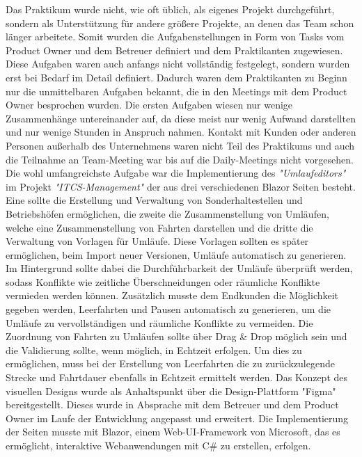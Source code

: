     Das Praktikum wurde nicht, wie oft üblich, als eigenes Projekt durchgeführt, sondern als
    Unterstützung für andere größere Projekte, an denen das Team schon länger arbeitete. Somit wurden die Aufgabenstellungen in Form von Tasks vom Product Owner und dem Betreuer definiert 
    und dem Praktikanten zugewiesen. Diese Aufgaben waren auch anfangs nicht vollständig festgelegt, sondern wurden erst bei Bedarf im Detail definiert. Dadurch waren dem Praktikanten zu Beginn
    nur die unmittelbaren Aufgaben bekannt, die in den Meetings mit dem Product Owner besprochen wurden.
    Die ersten Aufgaben wiesen nur wenige Zusammenhänge untereinander auf, da diese meist nur wenig Aufwand darstellten und nur wenige Stunden in Anspruch nahmen. 
    Kontakt mit Kunden oder anderen Personen außerhalb des Unternehmens waren nicht Teil des Praktikums und auch die Teilnahme an Team-Meeting war bis auf die Daily-Meetings nicht vorgesehen.
    Die wohl umfangreichste Aufgabe war die Implementierung des  \emph{"Umlaufeditors"} im Projekt \emph{"ITCS-Management"} der aus drei verschiedenen Blazor Seiten besteht. Eine sollte die Erstellung 
    und Verwaltung von Sonderhaltestellen und Betriebshöfen ermöglichen, die zweite die Zusammenstellung von Umläufen, welche eine Zusammenstellung von Fahrten darstellen und 
    die dritte die Verwaltung von Vorlagen für Umläufe. Diese Vorlagen sollten es später ermöglichen, beim Import neuer Versionen, Umläufe automatisch zu generieren. Im Hintergrund sollte dabei
    die Durchführbarkeit der Umläufe überprüft werden, sodass Konflikte wie zeitliche Überschneidungen oder räumliche Konflikte vermieden werden können. Zusätzlich musste dem 
    Endkunden die Möglichkeit gegeben werden, Leerfahrten und Pausen automatisch zu generieren, um die Umläufe zu vervollständigen und räumliche Konflikte zu vermeiden. Die Zuordnung 
    von Fahrten zu Umläufen sollte über Drag \& Drop möglich sein und die Validierung sollte, wenn möglich, in Echtzeit erfolgen. Um dies zu ermöglichen, muss bei der Erstellung von Leerfahrten die zu 
    zurückzulegende Strecke und Fahrtdauer ebenfalls in Echtzeit ermittelt werden.
    Das Konzept des visuellen Designs wurde als Anhaltspunkt über die Design-Plattform "Figma"~\cite{figma} bereitgestellt. Dieses wurde in Absprache mit dem Betreuer und dem 
    Product Owner im Laufe der Entwicklung
    angepasst und erweitert. Die Implementierung der Seiten musste mit Blazor, einem Web-UI-Framework von Microsoft, das es ermöglicht, interaktive Webanwendungen mit C\# zu erstellen, erfolgen.
    
